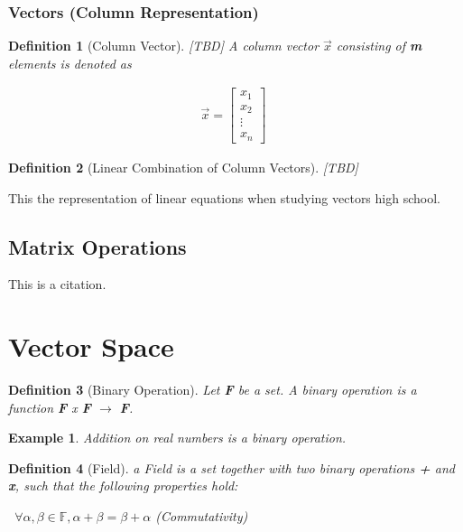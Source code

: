 \documentclass{article}
\newtheorem{definition}{Definition}[section] %
\newtheorem{example}{Example}[section]
\begin{document}
\subsubsection{Vectors (Column Representation)}
\begin{definition}[Column Vector] [TBD] A column vector $\vec{x}$ consisting of \textbf{m} elements is denoted as
\begin{center}
    \begin{equation}\label{col_vec}
    \begin{split}
    \vec{x}=\begin{bmatrix} x_1 \\ x_2 \\ \vdots \\ x_n \end{bmatrix} \;
    \end{split}
    \end{equation}
\end{center}
\end{definition}


\begin{definition}[Linear Combination of Column Vectors]
[TBD]
\end{definition}





This the representation of linear equations when studying vectors high school.


\subsection{Matrix Operations}

This is a citation\cite{Eg}.

\newpage


\section{Vector Space}
\begin{definition}[Binary Operation] Let \textbf{F} be a set. A binary operation is a function \textbf{F} x \textbf{F} $\rightarrow$ \textbf{F}.
\end{definition}
\begin{example} Addition on real numbers is a binary operation.
\end{example}

\begin{definition}[Field] a Field is a set together with two binary operations \textbf{+} and \textbf{x}, such that the following properties hold:
    \begin{enumerate}
    \ $\forall \alpha, \beta \in \mathbb{F}, \alpha+\beta=\beta+\alpha$ (Commutativity)

    \end{enumerate}

\end{definition}






\end{document}
